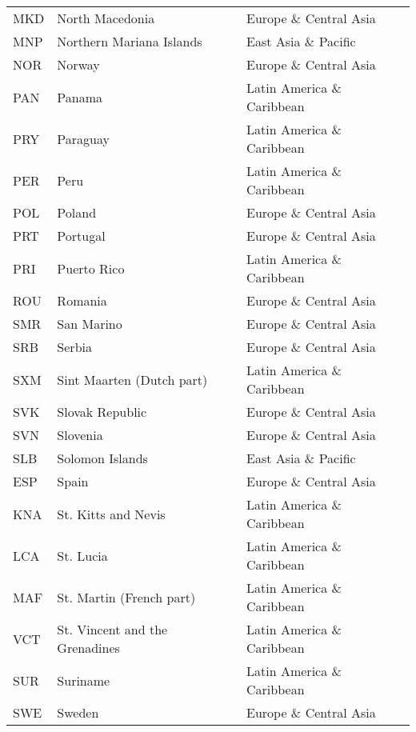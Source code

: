\documentclass[../main.tex]{subfiles}
\begin{document}
\begin{center}
\begin{longtable}[H]{lll}
MKD       & North Macedonia                & Europe \& Central Asia     \\
MNP       & Northern Mariana Islands       & East Asia \& Pacific       \\
NOR       & Norway                         & Europe \& Central Asia     \\
PAN       & Panama                         & Latin America \& Caribbean \\
PRY       & Paraguay                       & Latin America \& Caribbean \\
PER       & Peru                           & Latin America \& Caribbean \\
POL       & Poland                         & Europe \& Central Asia     \\
PRT       & Portugal                       & Europe \& Central Asia     \\
PRI       & Puerto Rico                    & Latin America \& Caribbean \\
ROU       & Romania                        & Europe \& Central Asia     \\
SMR       & San Marino                     & Europe \& Central Asia     \\
SRB       & Serbia                         & Europe \& Central Asia     \\
SXM       & Sint Maarten (Dutch part)      & Latin America \& Caribbean \\
SVK       & Slovak Republic                & Europe \& Central Asia     \\
SVN       & Slovenia                       & Europe \& Central Asia     \\
SLB       & Solomon Islands                & East Asia \& Pacific       \\
ESP       & Spain                          & Europe \& Central Asia     \\
KNA       & St. Kitts and Nevis            & Latin America \& Caribbean \\
LCA       & St. Lucia                      & Latin America \& Caribbean \\
MAF       & St. Martin (French part)       & Latin America \& Caribbean \\
VCT       & St. Vincent and the Grenadines & Latin America \& Caribbean \\
SUR       & Suriname                       & Latin America \& Caribbean \\
SWE       & Sweden                         & Europe \& Central Asia     \\

\end{longtable}
\end{center}
\end{document}
